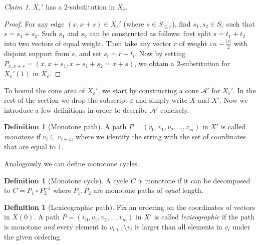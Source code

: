 \documentclass[10pt,a4paper]{article}
\theoremstyle{definition}
\newtheorem{definition}[theorem]{Definition}
\theoremstyle{remark}
\newtheorem{claim}[theorem]{Claim}
\newcommand{\abs}[1]{\lvert#1\rvert}
\newcommand{\set}[1]{\{#1\}}
\renewcommand{\le}{\leqslant}
\numberwithin{equation}{section}
\begin{document}
\begin{claim}\label{claim:X-2-sub}
    $X_\varepsilon'$ has a $2$-substitution in $X_\varepsilon$.
\end{claim}
\begin{proof}
    For any edge $(x, x+s)\in X_\varepsilon'$ (where $s \in S_{\le \varepsilon}$), find $s_1,s_2 \in S_\varepsilon$ such that $s = s_1 + s_2$. Such $s_1$ and $s_2$ can be constructed as follows: first split \(s=t_1+t_2\) into two vectors of equal weight. Then take any vector \(r\) of weight \(\varepsilon n - \frac{|s|}{2}\) with disjoint support from \(s\), and set \(s_i=r+t_i\). Now by setting $P_{x,x+s} = (x,x+s_1, x+s_1+s_2 = x+s)$, we obtain a $2$-substitution for $X_\varepsilon'(1)$ in $X_\varepsilon$. 
\end{proof}

To bound the cone area of \(X_\varepsilon'\), we start by constructing a cone $\mathcal{A}'$ for $X_\varepsilon'$. In the rest of the section we drop the subscript $\varepsilon$ and simply write $X$ and $X'$. Now we introduce a few definitions in order to describe $\mathcal{A}'$ concisely.

\begin{definition}[Monotone path]
    A path \(P=(v_0,v_1,v_2,\dots,v_m)\) in $X'$ is called \emph{monotone} if \(v_i \subseteq v_{i+1}\), where we identify the string with the set of coordinates that are equal to \(1\).  
\end{definition}

Analogously we can define monotone cycles.
\begin{definition}[Monotone cycle]
    A cycle \(C\) is monotone if it can be decomposed to \(C = P_1 \circ P_2^{-1}\) where \(P_1,P_2\) are monotone paths of \textit{equal} length.
\end{definition}

\begin{definition}[Lexicographic path]
    Fix an ordering on the coordinates of vectors in $X(0)$. A path \(P=(v_0,v_1,v_2,\dots,v_m)\) in $X'$ is called \emph{lexicographic} if the path is monotone \textit{and} every element in $v_{i+1}\setminus v_i$ is larger than all elements in $v_i$ under the given ordering.  
\end{definition}

\end{document}
